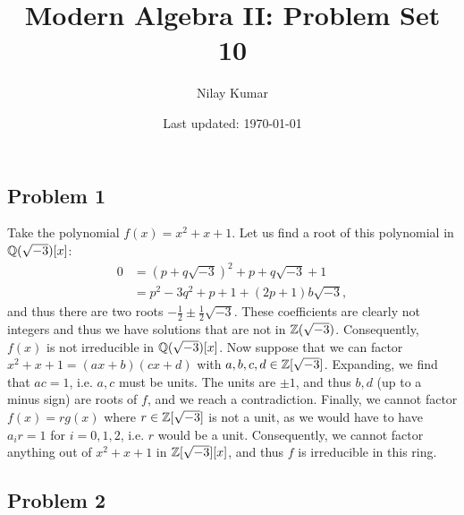 \documentclass{../../mathnotes}
\title{Modern Algebra II: Problem Set 10}
\author{Nilay Kumar}
\date{Last updated: \today}
\begin{document}
\maketitle

\subsection*{Problem 1}

Take the polynomial $f(x)=x^2+x+1$. Let us find a root of this polynomial in $\mathbb{Q}(\sqrt{-3})[x]$:
\begin{align*}
    0&=(p+q\sqrt{-3})^2+p+q\sqrt{-3}+1\\
    &=p^2-3q^2+p+1+(2p+1)b\sqrt{-3},
\end{align*}
and thus there are two roots $-\frac{1}{2}\pm\frac{1}{2}\sqrt{-3}$. These coefficients are clearly not
integers and thus we have solutions that are not in $\mathbb{Z}(\sqrt{-3})$. Consequently, $f(x)$ is not irreducible
in $\mathbb{Q}(\sqrt{-3})[x]$. Now suppose that we can factor $x^2+x+1=(ax+b)(cx+d)$ with $a,b,c,d\in\mathbb{Z}[\sqrt{-3}]$.
Expanding, we find that $ac=1$, i.e. $a,c$ must be units. The units are $\pm 1$, and thus $b,d$ (up to
a minus sign) are roots of $f$, and we reach a contradiction. Finally, we cannot factor $f(x)=rg(x)$ where
$r\in\mathbb{Z}[\sqrt{-3}]$ is not a unit, as we would have to have $a_ir=1$ for $i=0,1,2$, i.e. $r$ would be a unit.
Consequently, we cannot factor anything out of $x^2+x+1$ in $\mathbb{Z}[\sqrt{-3}][x]$, and thus $f$ is irreducible
in this ring.

\subsection*{Problem 2}
\end{document}
